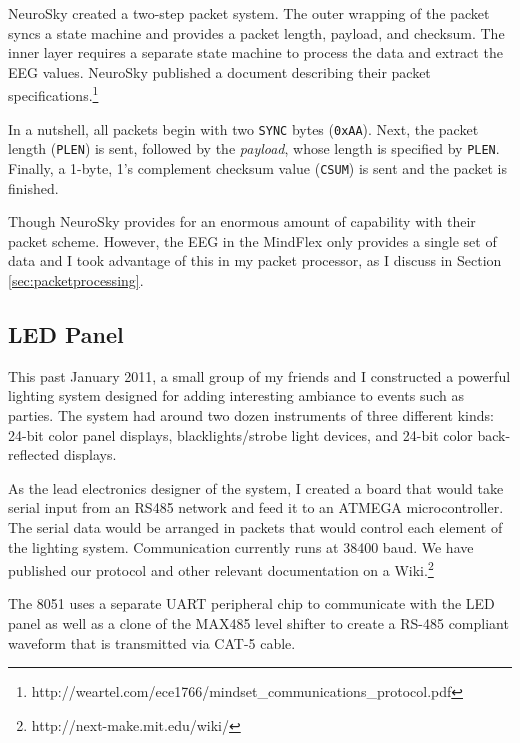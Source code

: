 \documentclass[letterpaper,10pt,notitlepage]{report}
\newcommand{\dat}[1]{\texttt{#1}}
\begin{document}
        NeuroSky created a two-step packet system.  The outer wrapping of the
        packet syncs a state machine and provides a packet length, payload, and
        checksum.  The inner layer requires a separate state machine to process
        the data and extract the EEG values.  NeuroSky published a document
        describing their packet
        specifications.\footnote{http://weartel.com/ece1766/mindset\_communications\_protocol.pdf}

        In a nutshell, all packets begin with two \dat{SYNC} bytes
        (\dat{0xAA}).  Next, the packet length (\dat{PLEN}) is sent, followed
        by the \emph{payload}, whose length is specified by \dat{PLEN}.
        Finally, a 1-byte, 1's complement checksum value (\dat{CSUM}) is sent
        and the packet is finished.

        Though NeuroSky provides for an enormous amount of capability with
        their packet scheme.  However, the EEG in the MindFlex only provides a
        single set of data and I took advantage of this in my packet processor,
        as I discuss in Section \ref{sec:packetprocessing}.

    \subsection{LED Panel}

        This past January 2011, a small group of my friends and I constructed a
        powerful lighting system designed for adding interesting ambiance to
        events such as parties.  The system had around two dozen instruments of
        three different kinds: 24-bit color panel displays, blacklights/strobe
        light devices, and 24-bit color back-reflected displays.

        As the lead electronics designer of the system, I created a board that
        would take serial input from an RS485 network and feed it to an ATMEGA
        microcontroller.  The serial data would be arranged in packets that
        would control each element of the lighting system.  Communication
        currently runs at 38400 baud.  We have published our protocol and other
        relevant documentation on a
        Wiki.\footnote{http://next-make.mit.edu/wiki/}
        
        The 8051 uses a separate UART peripheral chip to communicate with the
        LED panel as well as a clone of the MAX485 level shifter to create a
        RS-485 compliant waveform that is transmitted via CAT-5 cable.
\end{document}
